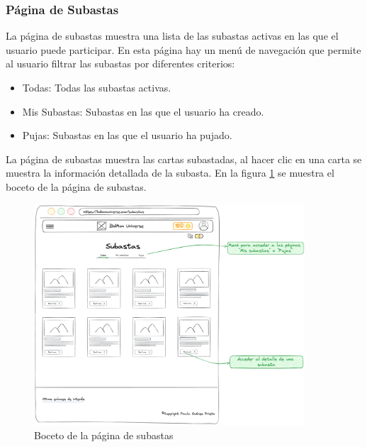 \subsubsection{Página de Subastas}
La página de subastas muestra una lista de las subastas activas en las que el usuario puede participar.
En esta página hay un menú de navegación que permite al usuario filtrar las subastas por diferentes criterios:
\begin{itemize}
    \item Todas: Todas las subastas activas.
    \item Mis Subastas: Subastas en las que el usuario ha creado.
    \item Pujas: Subastas en las que el usuario ha pujado.
\end{itemize}
La página de subastas muestra las cartas subastadas, al hacer clic en una carta se muestra la información detallada de la subasta.
En la figura \ref{fig:p_auctions} se muestra el boceto de la página de subastas.
\begin{figure}[H]
    \centering
    \includegraphics[width=0.9\textwidth]{figures/6-Analisis/6-Interfaz/prototipos/subastas.png}
    \caption{Boceto de la página de subastas}
    \label{fig:p_auctions}
\end{figure}

